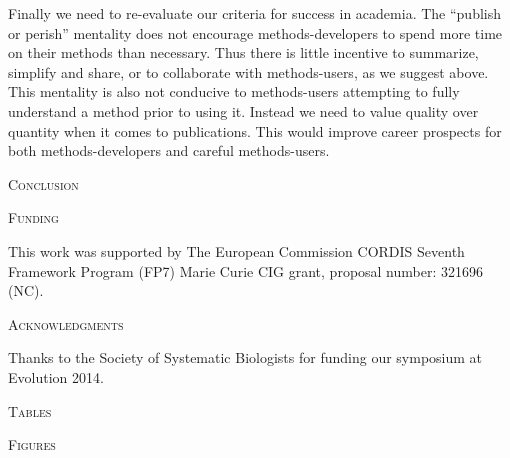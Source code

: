 \documentclass[a4paper,12pt]{article}
\renewcommand{\section}[1]{
  \bigskip
  \begin{center}
  \begin{Large}
  \normalfont\scshape #1
  \medskip
  \end{Large}
  \end{center}
}
\begin{document}
Finally we need to re-evaluate our criteria for success in academia. 
The ``publish or perish'' mentality does not encourage methods-developers to spend more time on their methods than necessary. 
Thus there is little incentive to summarize, simplify and share, or to collaborate with methods-users, as we suggest above. 
This mentality is also not conducive to methods-users attempting to fully understand a method prior to using it. 
Instead we need to value quality over quantity when it comes to publications.
This would improve career prospects for both methods-developers and careful methods-users.

\section{Conclusion}

\section{Funding}
This work was supported by The European Commission CORDIS Seventh Framework Program (FP7) Marie Curie CIG grant, proposal number: 321696 (NC). 

\section{Acknowledgments}
Thanks to the Society of Systematic Biologists for funding our symposium at Evolution 2014. 




\newpage
\section{Tables}

\newpage
\section{Figures}
\end{document}
